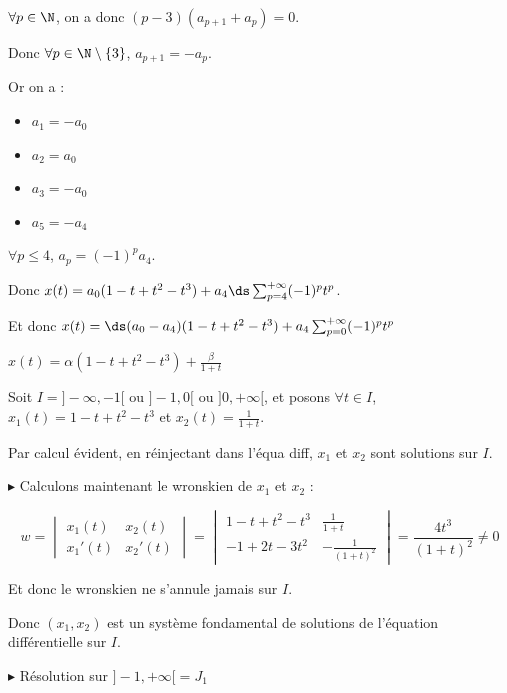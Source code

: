 \begin{exemple}
    $\forall p \in \N$, on a donc $(p - 3)(a_{p + 1} + a_p) = 0$.

    Donc $\forall p \in \N \setminus \{ 3 \}$, $a_{p + 1} = - a_p$. 

    Or on a : 
    \begin{itemize}
        \item $a_1 = -a_0$
        \item $a_2 = a_0$
        \item $a_3 = -a_0$
        \item $a_5 = -a_4$
    \end{itemize}

    $\forall p \leqslant 4$, $a_p = (-1)^p a_4$. 

    Donc $x(t) = a_0 (1 -t + t^2 - t^3) + a_4 \ds \sum_{p = 4}^{+ \infty} (-1)^p t^p$.

    Et donc $x(t) = \ds (a_0 - a_4)(1 - t + t^2 - t^3) + a_4 \sum_{p = 0}^{+ \infty} (-1)^p t^p$

    $x(t) = \alpha (1 - t + t^2 - t^3) + \frac \beta {1 + t}$

    Soit $I = ] - \infty, -1[$ ou $ ]-1, 0[$ ou $] 0, + \infty[$, et posons 
    $\forall t \in I$, $x_1(t) = 1 - t + t^2 - t^3$ et $x_2(t) = \frac 1 {1 + t}$. 

    Par calcul évident, en réinjectant dans l'équa diff, $x_1$ et $x_2$ sont solutions
    sur $I$.

    \avspace $\blacktriangleright$ Calculons maintenant le wronskien de $x_1$ et $x_2$ :

    $$w = \begin{vmatrix}
        x_1(t) & x_2(t) \\
        x_1'(t) & x_2'(t)
    \end{vmatrix} = \begin{vmatrix}
        1 - t + t^2 - t^3 & \frac 1 {1 + t} \\
        -1 + 2t - 3t^2 & -\frac 1 {(1 + t)^2}
    \end{vmatrix} = \frac {4t^3} {(1 + t)^2} \neq 0$$

    Et donc le wronskien ne s'annule jamais sur $I$. 

    Donc $(x_1, x_2)$ est un système fondamental de solutions de l'équation différentielle sur $I$.

    \lvspace \avspace {}

    \lvspace $\blacktriangleright$ Résolution sur $]-1, +\infty[ = J_1$


\end{exemple}
